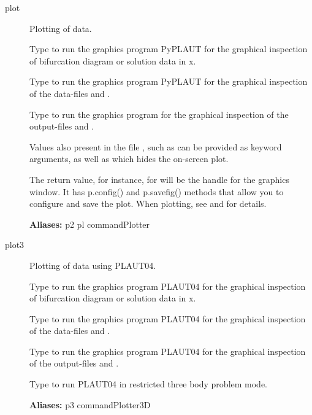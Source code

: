 \documentclass[12pt]{report}
\begin{document}
\begin{description}
\item[plot]
Plotting of data.

    Type  to run the graphics program PyPLAUT for the graphical
    inspection of bifurcation diagram or solution data in x.

    Type  to run the graphics program PyPLAUT for the graphical
    inspection of the data-files  and .

    Type  to run the graphics program for the graphical
    inspection of the output-files  and .

    Values also present in the file , such as
     can be provided as
    keyword arguments, as well as  which hides the
    on-screen plot.

    The return value, for instance,  for
     will be the handle for the graphics window.
    It has p.config() and p.savefig() methods that allow you to configure
    and save the plot. When plotting, see 
    and  for details.

\textbf{Aliases:} p2 pl commandPlotter

\item[plot3]
Plotting of data using PLAUT04.

    Type  to run the graphics program PLAUT04 for the graphical
    inspection of bifurcation diagram or solution data in x.

    Type  to run the graphics program PLAUT04 for the graphical
    inspection of the data-files  and .

    Type  to run the graphics program PLAUT04 for the graphical
    inspection of the output-files  and .

    Type  to run PLAUT04 in restricted three body
    problem mode.
    
\textbf{Aliases:} p3 commandPlotter3D
\end{description}
\end{document}
